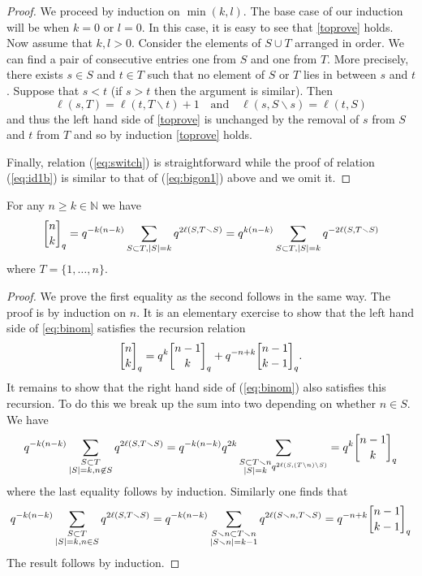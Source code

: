 \documentclass[11pt]{amsart}
\begin{document}
\begin{proof}
We proceed by induction on $\min(k,l)$.  The base case of our induction will be when $ k = 0 $ or $ l = 0 $.  In this case, it is easy to see that \eqref{toprove} holds. Now assume that $k,l > 0 $.  Consider the elements of $ S \cup T $ arranged in order.  We can find a pair of consecutive entries one from $ S $ and one from $ T $.  More precisely, there exists $ s \in S $ and $ t \in T $ such that no element of $ S $ or $ T $ lies in between $ s $ and $ t $.   Suppose that $ s < t$ (if $ s> t$ then the argument is similar).  Then
$$ \ell(s,T) = \ell(t, T \smallsetminus t) + 1 \ \ \ \text{ and } \ \ \  \ell(s, S \smallsetminus s) = \ell(t, S) $$
and thus the left hand side of \eqref{toprove} is unchanged by the removal of $ s $ from $ S $ and $ t $ from $ T $ and so by induction \eqref{toprove} holds.

Finally, relation (\ref{eq:switch}) is straightforward while the proof of relation (\ref{eq:id1b}) is similar to that of (\ref{eq:bigon1}) above and we omit it. 
\end{proof}

\begin{lem}\label{lem:binom}
For any $n \ge k \in {\mathbb N}$ we have
\begin{equation}\label{eq:binom}
\qBinomial{n}{k} = q^{-k(n-k)} \sum_{S \subset T, |S|=k} q^{2 \ell(S, T \smallsetminus S)} = q^{k(n-k)} \sum_{S \subset T, |S|=k} q^{-2 \ell(S, T \smallsetminus S)}
\end{equation}
where $T = \{1, \dots, n\}$.
\end{lem}
\begin{proof}
We prove the first equality as the second follows in the same way. The proof is by induction on $n$. It is an elementary exercise to show that the left hand side of \eqref{eq:binom} satisfies the recursion relation
$$\qBinomial{n}{k} = q^k \qBinomial{n-1}{k} + q^{-n+k} \qBinomial{n-1}{k-1}.$$
It remains to show that the right hand side of (\ref{eq:binom}) also satisfies this recursion. To do this we break up the sum into two depending on whether $n \in S$. We have
$$q^{-k(n-k)} \sum_{\substack{S \subset T \\ |S|=k, n \not\in S}} q^{2 \ell(S, T \smallsetminus S)} = q^{-k(n-k)} q^{2k} \sum_{\substack{S \subset T \smallsetminus n \\ |S|=k} q^{2\ell(S,(T\setminus n)\setminus S)}} = q^k \qBinomial{n-1}{k}$$
where the last equality follows by induction. Similarly one finds that
$$q^{-k(n-k)} \sum_{\substack{S \subset T \\ |S|=k, n \in S}} q^{2 \ell(S, T \smallsetminus S)} = q^{-k(n-k)} \sum_{\substack{S \smallsetminus n \subset T \smallsetminus n \\ |S \smallsetminus n| = k-1}} q^{2 \ell(S \smallsetminus n, T \smallsetminus S)} = q^{-n+k} \qBinomial{n-1}{k-1}$$
The result follows by induction.
\end{proof}
\end{document}
